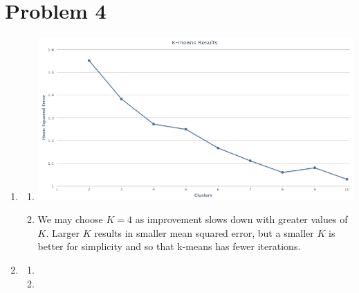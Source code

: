 \documentclass{article}
\begin{document}
\section*{Problem 4}
\begin{enumerate}
\item 
  \begin{enumerate}
  \item \includegraphics[scale=0.5]{kmeansresults.png} 
  \item We may choose $K=4$ as improvement slows down with
    greater values of $K$. Larger $K$ results in smaller 
    mean squared error, but a smaller $K$ is better for 
    simplicity and so that k-means has fewer iterations. 
  \end{enumerate}
\item 
  \begin{enumerate}
  \item 
  \item 
  \end{enumerate}
\end{enumerate}
\end{document}
